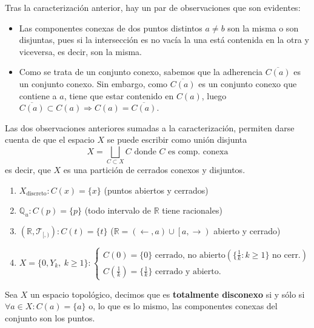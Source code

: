 \begin{obs}
Tras la caracterización anterior, hay un par de observaciones que son evidentes:
\begin{itemize}
\item Las componentes conexas de dos puntos distintos $a \neq b$ son la misma o son disjuntas, pues si la intersección es no vacía la una está contenida en la otra y viceversa, es decir, son la misma.
\item Como se trata de un conjunto conexo, sabemos que la adherencia $\overline{C(a)}$ es un conjunto conexo. Sin embargo, como $\overline{C(a)}$ es un conjunto conexo que contiene a $a$, tiene que estar contenido en $C(a)$, luego $\overline{C(a)} \subset C(a) \Rightarrow C(a) = \overline{C(a)}$.
\end{itemize}
Las dos observaciones anteriores sumadas a la caracterización, permiten darse cuenta de que el espacio $X$ se puede escribir como unión disjunta
\[
X = \bigsqcup_{C\subset X} C \mbox{ donde }C \mbox{ es comp. conexa}
\]
es decir, que $X$ es una partición de cerrados conexos y disjuntos.
\end{obs}

\begin{ej}
\begin{enumerate}
    \item $X_{\text{discreto}}: C\left( x \right) = \{x\}$ (puntos abiertos y cerrados)
    \item $\mathbb{Q}_u : C\left( p \right) = \{p\}$ (todo intervalo de $\mathbb{R}$ tiene racionales)
    \item $\left( \mathbb{R}, \mathcal{T}_{[, )} \right): C\left( t \right) = \{t\}$ ($\mathbb{R} = \left( \leftarrow, a \right) \cup \left[ a, \rightarrow \right)$ abierto y cerrado)
    \item $X = \{0, Y_k,\ k \ge 1\} : \begin{cases}
        C\left( 0 \right) = \{0\} \text{ cerrado, no abierto} \left( \{\frac{1}{k}: k\ge 1 \}  \text{ no cerr.}\right)\\
        C\left( \frac{1}{k} \right) = \{\frac{1}{k}\} \text{ cerrado y abierto.} 
    \end{cases} $
\end{enumerate}
\end{ej}

\begin{defi}
Sea $X$ un espacio topológico, decimos que es \textbf{totalmente disconexo} si y sólo si $\forall a \in X : C(a) = \{a\}$ o, lo que es lo mismo, las componentes conexas del conjunto son los puntos.
\end{defi}

